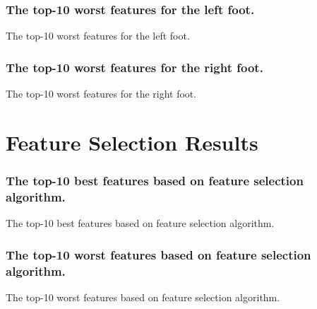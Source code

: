 \documentclass{beamer}
\begin{document}
\begin{frame}[shrink=10]
\frametitle{The top-10 worst features for the left foot.}
\tiny
\begin{table}
\begin{adjustbox}
\centering
\caption{\small The top-10 worst features for the left foot.}

\end{adjustbox}
\end{table}
\end{frame}

\begin{frame}[shrink=10]
\frametitle{The top-10 worst features for the right foot.}
\tiny
\begin{table}
\begin{adjustbox}
\centering
\caption{\small The top-10 worst features for the right foot.}

\end{adjustbox}
\end{table}
\end{frame}


\section{Feature Selection Results}
\begin{frame}[shrink=10]
\frametitle{The top-10 best features based on feature selection algorithm.}
\tiny
\begin{table}
\begin{adjustbox}
\centering
\caption{\small The top-10 best features based on feature selection algorithm.}

\end{adjustbox}
\end{table}
\end{frame}

\begin{frame}[shrink=10]
\frametitle{The top-10 worst features based on feature selection algorithm.}
\tiny
\begin{table}
\begin{adjustbox}
\centering
\caption{\small The top-10 worst features based on feature selection algorithm.}

\end{adjustbox}
\end{table}
\end{frame}
\end{document}
